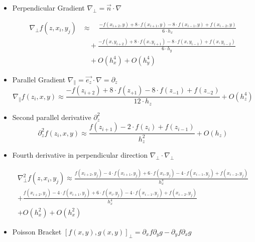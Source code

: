 \begin{itemize}
    \item Perpendicular Gradient $\nabla_{\perp} = \vec{n}\cdot\nabla$\\
     \begin{small}
        \begin{equation}
        \begin{split}
            \nabla_{\perp} f(z, x_i,y_j) &\approx  \quad\frac{-f(x_{i+2},y) + 8 \cdot f(x_{i + 1}, y) -  8 \cdot f(x_{i - 1}, y) + f(x_{i - 2}, y)}{6 \cdot h_x} \\
            &\quad + \frac{-f(x,y_{i + 2}) + 8 \cdot f(x, y_{i + 1}) -  8 \cdot f(x, y_{i - 1}) + f(x, y_{i - 2})}{6 \cdot h_y}\\
            &\quad + O(h_x^4) + O(h_y^4)
        \end{split}
        \end{equation}
    \end{small}
    \item Parallel Gradient $\nabla_{\parallel} = \vec{e_z}\cdot\nabla = \partial_z$\\
    \begin{equation}
        \nabla_{\parallel} f(z_i,x,y) \approx \frac{-f(z_{i+2}) + 8 \cdot f(z_{+1}) - 8 \cdot f(z_{-1}) + f(z_{-2})}{12 \cdot h_z} + O(h_z^4)
    \end{equation}
    \item Second parallel derivative $\partial_z^2$\\
    \begin{equation}
           \partial_z^2f(z_i,x,y) \approx \frac{f(z_{i+1})-2\cdot f(z_i)+ f(z_{i-1})}{h_z^2} + O(h_z)
    \end{equation}
    \item Fourth derivative in perpendicular direction $\nabla_\perp \cdot \nabla_\perp$\\
    \begin{footnotesize}
    \begin{equation}
    \begin{split}
    \nabla_\perp^2f(z,x_i,y_j) \approx \frac{f(x_{i+2},y_j) - 4 \cdot f(x_{i+1},y_j) +6\cdot f(x_i,y_j) -4 \cdot f(x_{i-1},y_j) + f(x_{i-2}, y_j)}{h_x^4}  \\ + \frac{f(x_{i+2},y_j) - 4 \cdot f(x_{i+1},y_j) +6\cdot f(x_i,y_j) -4 \cdot f(x_{i-1},y_j) + f(x_{i-2}, y_j)}{h_x^4}  \\  + O(h_x^2) + O(h_x^2)
    \end{split}
    \end{equation}
    \end{footnotesize}
    \item Poisson Bracket $[f(x,y),g(x,y)]_\perp = \partial_x f \partial_y g - \partial_y f \partial_x g$
\end{itemize}

